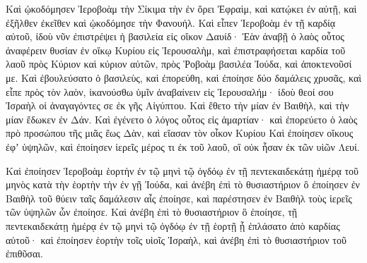 {\par }{\PP {}Καὶ ᾠκοδόμησεν Ἱεροβοὰμ τὴν Σίκιμα τὴν ἐν ὄρει Ἐφραὶμ, καὶ κατῴκει ἐν αὐτῇ, καὶ ἐξῆλθεν ἐκεῖθεν καὶ ᾠκοδόμησε τὴν Φανουήλ.
Καὶ εἶπεν Ἱεροβοὰμ ἐν τῇ καρδίᾳ αὐτοῦ, ἰδοὺ νῦν ἐπιστρέψει ἡ βασιλεία εἰς οἴκον Δαυίδ·
Ἐὰν ἀναβῇ ὁ λαὸς οὗτος ἀναφέρειν θυσίαν ἐν οἴκῳ Κυρίου εἰς Ἱερουσαλὴμ, καὶ ἐπιστραφήσεται καρδία τοῦ λαοῦ πρὸς Κύριον καὶ κύριον αὐτῶν, πρὸς Ῥοβοὰμ βασιλέα Ἰούδα, καὶ ἀποκτενοῦσί με.
Καὶ ἐβουλεύσατο ὁ βασιλεὺς, καὶ ἐπορεύθη, καὶ ἐποίησε δύο δαμάλεις χρυσᾶς, καὶ εἶπε πρὸς τὸν λαὸν, ἱκανούσθω ὑμῖν ἀναβαίνειν εἰς Ἱερουσαλήμ· ἰδοὺ θεοί σου Ἰσραὴλ οἱ ἀναγαγόντες σε ἐκ γῆς Αἰγύπτου.
Καὶ ἔθετο τὴν μίαν ἐν Βαιθὴλ, καὶ τὴν μίαν ἔδωκεν ἐν Δάν.
Καὶ ἐγένετο ὁ λόγος οὗτος εἰς ἁμαρτίαν· καὶ ἐπορεύετο ὁ λαὸς πρὸ προσώπου τῆς μιᾶς ἕως Δὰν, καὶ εἴασαν τὸν οἶκον Κυρίου
Καὶ ἐποίησεν οἴκους ἐφʼ ὑψηλῶν, καὶ ἐποίησεν ἱερεῖς μέρος τι ἐκ τοῦ λαοῦ, οἳ οὐκ ἦσαν ἐκ τῶν υἱῶν Λευί.
\par }{\PP {}Καὶ ἐποίησεν Ἱεροβοὰμ ἑορτὴν ἐν τῷ μηνὶ τῷ ὀγδόῳ ἐν τῇ πεντεκαιδεκάτῃ ἡμέρᾳ τοῦ μηνὸς κατὰ τὴν ἑορτὴν τὴν ἐν γῇ Ἰούδα, καὶ ἀνέβη ἐπὶ τὸ θυσιαστήριον ὃ ἐποίησεν ἐν Βαιθὴλ τοῦ θύειν ταῖς δαμάλεσιν αἷς ἐποίησε, καὶ παρέστησεν ἐν Βαιθὴλ τοὺς ἱερεῖς τῶν ὑψηλῶν ὧν ἐποίησε.
Καὶ ἀνέβη ἐπὶ τὸ θυσιαστήριον ὃ ἐποίησε, τῇ πεντεκαιδεκάτῃ ἡμέρᾳ ἐν τῷ μηνὶ τῷ ὀγδόῳ ἐν τῇ ἑορτῇ ᾗ ἐπλάσατο ἀπὸ καρδίας αὐτοῦ· καὶ ἐποίησεν ἑορτὴν τοῖς υἱοῖς Ἰσραὴλ, καὶ ἀνέβη ἐπὶ τὸ θυσιαστήριον τοῦ ἐπιθῦσαι.

}
